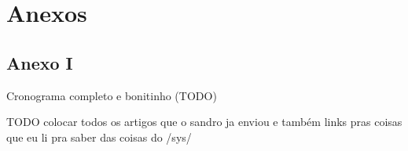 \documentclass[11pt,a4paper,titlepage]{article}
\begin{document}
\section{Anexos}
\subsection{Anexo I}
Cronograma completo e bonitinho (TODO)

\nocite{cormen,knuth,manber}	
TODO colocar todos os artigos que o sandro ja enviou e também links pras coisas que eu li pra saber das coisas do /sys/


\end{document}
